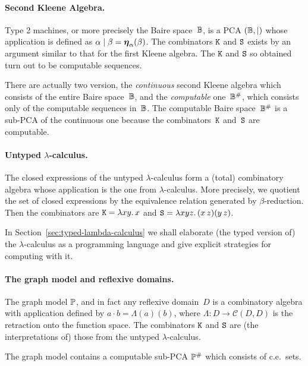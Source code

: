 \paragraph{Second Kleene Algebra.}

Type 2 machines, or more precisely the Baire space~$\mathbb{B}$, is a PCA
$(\mathbb{B}, {\mid})$ whose application is defined as $\alpha \mid \beta
= \text{\boldmath{$\eta$}}_{\alpha}(\beta)$. The combinators $\mathtt{K}$ and $\mathtt{S}$ exists
by an argument similar to that for the first Kleene algebra. The
$\mathtt{K}$ and $\mathtt{S}$ so obtained turn out to be computable sequences.

There are actually two version, the \emph{continuous} second Kleene
algebra which consists of the entire Baire space~$\mathbb{B}$, and the
\emph{computable} one~$\mathbb{B}^{\#}$, which consists only of the
computable sequences in~$\mathbb{B}$. The computable Baire
space~$\mathbb{B}^{\#}$ is a sub-PCA of the continuous one because the
combinators~$\mathtt{K}$ and~$\mathtt{S}$ are computable.

\paragraph{Untyped $\lambda$-calculus.}

The closed expressions of the untyped $\lambda$-calculus form a
(total) combinatory algebra whose application is the one from
$\lambda$-calculus. More precisely, we quotient the set of closed
expressions by the equivalence relation generated by
$\beta$-reduction. Then the combinators are $\mathtt{K} = \lambda x y .\,x$
and $\mathtt{S} = \lambda x y z .\,(x \, z)(y \, z)$.

In Section~\ref{sec:typed-lambda-calculus} we shall elaborate
(the typed version of) the $\lambda$-calculus as a programming
language and give explicit strategies for computing with it.


\paragraph{The graph model and reflexive domains.}

The graph model $\mathbb{P}$, and in fact any reflexive domain~$D$ is a
combinatory algebra with application defined by $a \cdot b =
\Lambda(a)(b)$, where $\Lambda : D \to \mathcal{C}(D, D)$ is the
retraction onto the function space. The combinators $\mathtt{K}$ and
$\mathtt{S}$ are (the interpretations of) those from the untyped
$\lambda$-calculus.

The graph model contains a computable sub-PCA $\mathbb{P}^{\#}$ which
consists of c.e.~sets.


